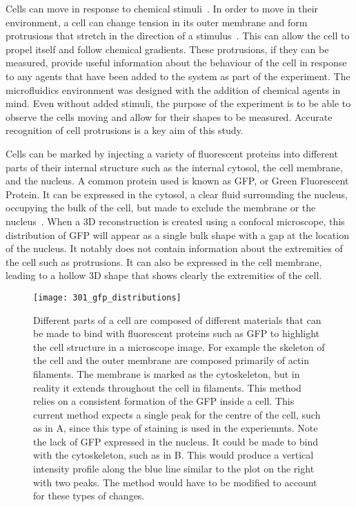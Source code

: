 Cells can move in response to chemical stimuli~\cite{Stetler:93}. In order to move in their environment, a cell can change tension in its outer membrane and form protrusions that stretch in the direction of a stimulus~\cite{Stetler:93}. This can allow the cell to propel itself and follow chemical gradients. These protrusions, if they can be measured, provide useful information about the behaviour of the cell in response to any agents that have been added to the system as part of the experiment. The microfluidics environment was designed with the addition of chemical agents in mind. Even without added stimuli, the purpose of the experiment is to be able to observe the cells moving and allow for their shapes to be measured. Accurate recognition of cell protrusions is a key aim of this study.

Cells can be marked by injecting a variety of fluorescent proteins into different parts of their internal structure such as the internal cytosol, the cell membrane, and the nucleus. A common protein used is known as GFP, or Green Fluorescent Protein. It can be expressed in the cytosol, a clear fluid surrounding the nucleus, occupying the bulk of the cell, but made to exclude the membrane or the nucleus~\cite{Zou:05}. When a 3D reconstruction is created using a confocal microscope, this distribution of GFP will appear as a single bulk shape with a gap at the location of the nucleus. It notably does not contain information about the extremities of the cell such as protrusions. It can also be expressed in the cell membrane, leading to a hollow 3D shape that shows clearly the extremities of the cell.

\begin{figure}[h!]
 \centering
 \texttt{[image: 301\_gfp\_distributions]}
 \caption[Possible GFP distributions]{
	Different parts of a cell are composed of different materials that can be made to bind with fluorescent proteins such as GFP to highlight the cell structure in a microscope image. For example the skeleton of the cell and the outer membrane are composed primarily of actin filaments. The membrane is marked as the cytoskeleton, but in reality it extends throughout the cell in filaments. This method relies on a consistent formation of the GFP inside a cell. This current method expects a single peak for the centre of the cell, such as in A, since this type of staining is used in the experiemnts. Note the lack of GFP expressed in the nucleus. It could be made to bind with the cytoskeleton, such as in B. This would produce a vertical intensity profile along the blue line similar to the plot on the right with two peaks. The method would have to be modified to account for these types of changes.
 }
 \label{fig:gfpdistributions}
\end{figure}


